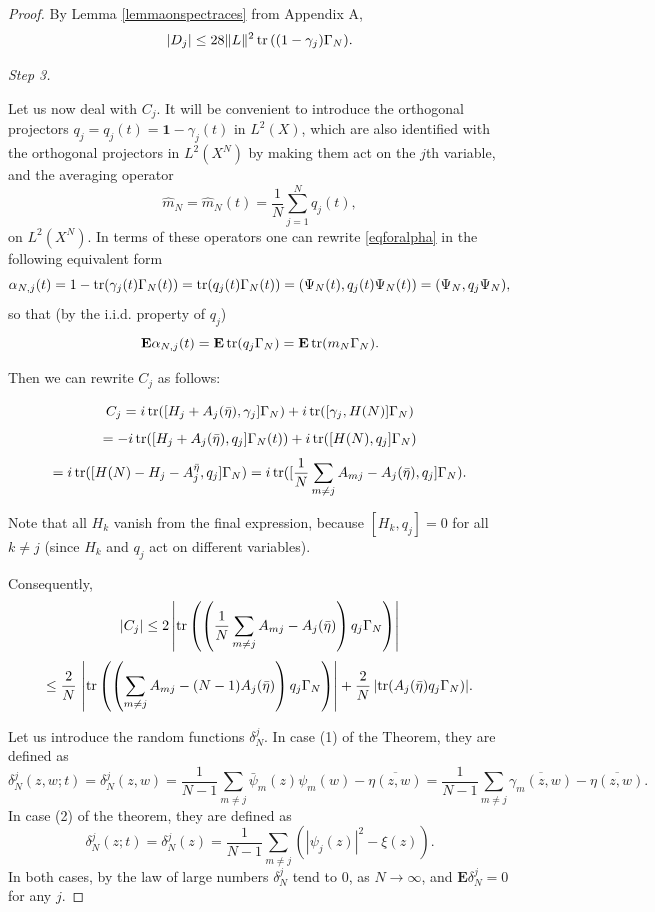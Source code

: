 \documentclass[12pt]{article}
\def\E{\mathbf{E}}
\def\1{\mathbf{1}}
\def\tr{\rm{tr}}
\def\al{\alpha}
\def\de{\delta}
\def\ga{\gamma}
\newcommand{\Ga}{\Gamma}
\begin{document}
\begin{proof}
By Lemma \ref{lemmaonspectraces} from Appendix A,
\[
|D_j| \le  28 \|L\|^2 \, {\tr}\, ((1-\ga_j) \Ga_N).
\]

{\it Step 3.}

Let us now deal with $C_j$.
It will be convenient to introduce the orthogonal projectors  $q_j=q_j(t)=\1-\ga_j(t)$ in $L^2(X)$,
which are also identified
with the orthogonal projectors in $L^2(X^N)$ by making them act on the $j$th variable, and
the averaging operator
\begin{equation}
\label{eqdefaverkn}
\hat m_N =\hat m_N(t)=\frac{1}{N} \sum_{j=1}^N q_j(t),
\end{equation}
on $L^2(X^N)$. In terms of these operators one can  rewrite \eqref{eqforalpha}
in the following equivalent form
\begin{equation}
\label{eqforalphacon}
\al_{N,j}(t)=1-{\tr}(\ga_j(t) \Ga_N(t))={\tr}(q_j(t) \Ga_N(t))=(\Psi_N(t), q_j(t) \Psi_N(t))=(\Psi_N, q_j \Psi_N),
\end{equation}
so that (by the i.i.d. property of $q_j$)
\begin{equation}
\label{eqforalphaconex}
\E \al_{N,j}(t)=\E \, {\tr}(q_j \Ga_N)=\E \, {\tr}(m_N \Ga_N).
\end{equation}

Then we can rewrite $C_j$ as follows:

\[
C_j =i \, {\tr} ([H_j+A_j(\bar \eta),\ga_j]\Ga_N)
 +i \, {\tr} ([\ga_j,H(N)] \Ga_N)
\]
\[
=-i \, {\tr} ([H_j+A_j(\bar \eta),q_j]\Ga_N(t))
 +i \, {\tr} ([H(N),q_j] \Ga_N)
 \]
 \[
=i \, {\tr} ([H(N)-H_j-A_j^{\bar \eta},q_j] \Ga_N) \\
=i \, {\tr} ([\frac{1}{N}\sum_{m\neq j} A_{mj}-A_j(\bar \eta),q_j] \Ga_N).
\]

Note that all $H_k$ vanish from the final expression, because $[H_k, q_j]=0$ for all $k\neq j$
(since $H_k$ and $q_j$ act on different variables).

Consequently,
\[
|C_j|
\le 2 \left|{\tr} \left(\left(\frac{1}{N}\sum_{m\neq j} A_{mj}-A_j(\bar \eta)\right)q_j \Ga_N\right) \right|
\]
\begin{equation}
\label{eqforalphaconder1}
\le \frac{2}{N} \, \left|{\tr} \left(\left(\sum_{m\neq j} A_{mj}-(N-1)A_j(\bar \eta)\right) q_j \Ga_N\right)\right|
+\frac{2}{N} \, |{\tr} ( A_j(\bar \eta) q_j \Ga_N)|.
\end{equation}

Let us introduce the random functions $\de^j_N$.
In case (1) of the Theorem, they are defined as
\[
\de^j_N(z,w;t)=\de^j_N(z,w) =  \frac{1}{N-1}\sum_{m\neq j} \bar \psi_m(z) \psi_m(w)-\overline{\eta(z,w)}
=\frac{1}{N-1}\sum_{m\neq j}  \overline{\ga_m(z,w)}-\overline{\eta(z,w)}.
\]
In case (2) of the theorem, they are defined as
\[
\de^j_N(z;t) =\de^j_N(z)=  \frac{1}{N-1}\sum_{m\neq j} (|\psi_j(z)|^2-\xi(z)).
\]
In both cases, by the law of large numbers $\de^j_N$ tend to $0$,
as $N\to \infty$, and $\E \de^j_N=0$ for any $j$.


\end{proof}
\end{document}
